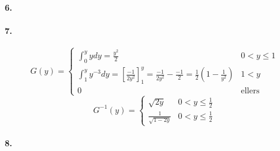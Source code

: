 \documentclass[12pt]{article}
\begin{document}
\paragraph{6.}
\paragraph{7.}
\[
    G(y) =
    \begin{cases}
        \int_0^y y dy = \frac{y^2}{2} & 0<y\leq 1\\
        \int_1^y y^{-3} dy = \left[ \frac{-1}{2y^2} \right]_1^y = \frac{-1}{2y^2} - \frac{-1}{2} = \frac{1}{2}\left( 1-\frac{1}{y^2} \right) & 1 < y \\
        0 &\text{ellers}
    \end{cases}
\]
\[
    G^{-1}(y) =
    \begin{cases}
        \sqrt{2y} & 0 < y \leq \frac{1}{2} \\
        \frac{1}{\sqrt{1-2y}} & 0 < y \leq \frac{1}{2}
    \end{cases}
\]
\paragraph{8.}
\end{document}
